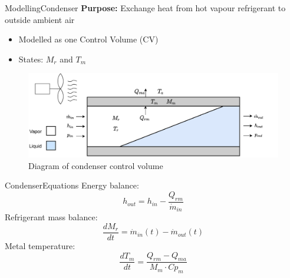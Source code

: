 \begin{frame}{Modelling}{Condenser}
	\textbf{Purpose:} Exchange heat from hot vapour refrigerant to outside ambient air 
	\begin{itemize}
		\item Modelled as one Control Volume (CV)
		\item States: $M_r$ and $T_m$
	\end{itemize}
	\begin{figure}[h!]
		\centering
		\includegraphics[width=1\textwidth]{../Graphics/Condenser.pdf}
		\caption{Diagram of condenser control volume}
		\label{fig:condenser_CV}
	\end{figure}
\end{frame}

\begin{frame}{Condenser}{Equations}
	Energy balance:
	\begin{equation}
		h_{out} = h_{in} - \frac{Q_{rm}}{\dot{m}_{in}} \label{eq:Condenser_Enthalpy}
	\end{equation}
	Refrigerant mass balance:
	\begin{equation}
		\frac{dM_r}{dt} 	 = \dot{m}_{in}(t) - \dot{m}_{out}(t) \label{eq:Condenser_ChangeOfMass}
	\end{equation}
	Metal temperature:
	\begin{equation}
		\frac{dT_m}{dt} 	 = \frac{Q_{rm} - Q_{ma}}{M_m \cdot Cp_m} \label{eq:Condenser_ChangeOfTemperature}
	\end{equation}
\end{frame}





